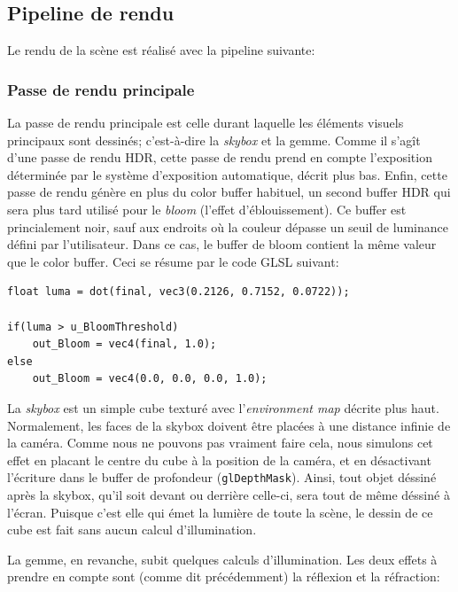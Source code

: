 \documentclass[a4paper,12pt]{article}
\newcommand{\svg}[2][0cm]{
    \begin{figure}[H]
        \centering
        \def\svgwidth{\columnwidth - #1}
        
    \end{figure}
}
\begin{document}
\subsection{Pipeline de rendu}
Le rendu de la scène est réalisé avec la pipeline suivante:
\svg{PipelineDeRendu}

\subsubsection{Passe de rendu principale}
La passe de rendu principale est celle durant laquelle les éléments visuels principaux sont dessinés; c'est-à-dire
la \emph{skybox} et la gemme. Comme il s'agît d'une passe de rendu HDR, cette passe de rendu prend en compte
l'exposition déterminée par le système d'exposition automatique, décrit plus bas. Enfin, cette passe de rendu
génère en plus du color buffer habituel, un second buffer HDR qui sera plus tard utilisé pour le \emph{bloom}
(l'effet d'éblouissement). Ce buffer est princialement noir, sauf aux endroits où la couleur dépasse un
seuil de luminance défini par l'utilisateur. Dans ce cas, le buffer de bloom contient la même valeur que le color
buffer. Ceci se résume par le code GLSL suivant:

\begin{lstlisting}
float luma = dot(final, vec3(0.2126, 0.7152, 0.0722));

if(luma > u_BloomThreshold)
    out_Bloom = vec4(final, 1.0);
else
    out_Bloom = vec4(0.0, 0.0, 0.0, 1.0);
\end{lstlisting}

La \emph{skybox} est un simple cube texturé avec l'\emph{environment map} décrite plus haut. Normalement, les faces
de la skybox doivent être placées à une distance infinie de la caméra. Comme nous ne pouvons pas vraiment faire cela,
nous simulons cet effet en placant le centre du cube à la position de la caméra, et en désactivant l'écriture dans le buffer
de profondeur (\texttt{glDepthMask}). Ainsi, tout objet déssiné après la skybox, qu'il soit devant ou derrière
celle-ci, sera tout de même déssiné à l'écran. Puisque c'est elle qui émet la lumière de toute la scène, le dessin de
ce cube est fait sans aucun calcul d'illumination.

La gemme, en revanche, subit quelques calculs d'illumination. Les deux effets à prendre en compte sont (comme dit précédemment)
la réflexion et la réfraction:
\svg[8cm]{refraction}
\end{document}
